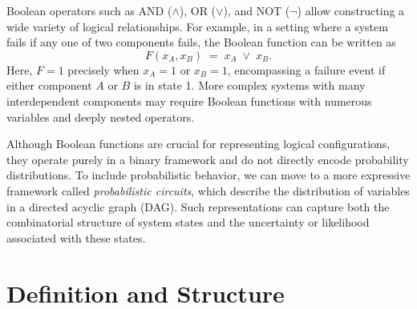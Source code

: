 \begin{center}
\end{center}

Boolean operators such as AND (\(\land\)), OR (\(\lor\)), and NOT (\(\lnot\)) allow constructing a wide variety of logical relationships. For example, in a setting where a system fails if any one of two components fails, the Boolean function can be written as
\[
F(x_A, x_B) \;=\; x_A \;\lor\; x_B.
\]
Here, \(F=1\) precisely when \(x_A=1\) or \(x_B=1\), encompassing a failure event if either component \(A\) or \(B\) is in state 1. More complex systems with many interdependent components may require Boolean functions with numerous variables and deeply nested operators.

Although Boolean functions are crucial for representing logical configurations, they operate purely in a binary framework and do not directly encode probability distributions. To include probabilistic behavior, we can move to a more expressive framework called \emph{probabilistic circuits}, which describe the distribution of variables in a directed acyclic graph (DAG). Such representations can capture both the combinatorial structure of system states and the uncertainty or likelihood associated with these states.

\section{Definition and Structure}

